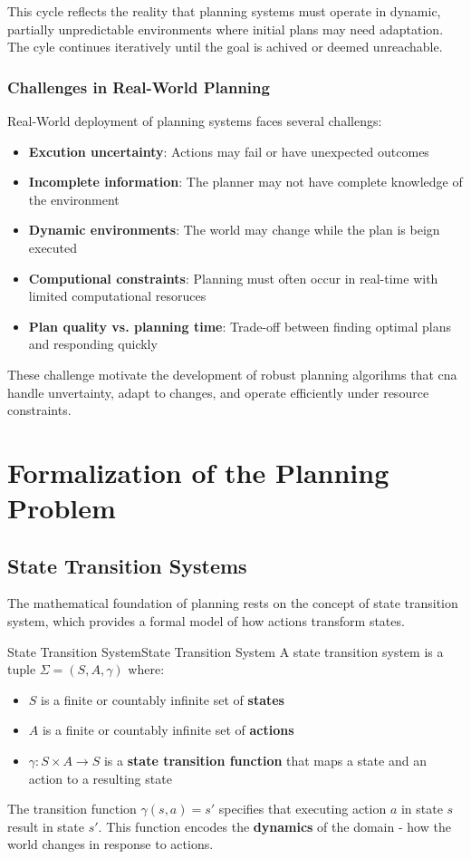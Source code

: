 \documentclass[a4paper]{article}
\theoremstyle{definition}
\begin{document}
This cycle reflects the reality that planning systems must operate in dynamic, partially unpredictable environments where
initial plans may need adaptation. The cyle continues iteratively until the goal is achived or deemed unreachable.
\subsubsection{Challenges in Real-World Planning}
Real-World deployment of planning systems faces several challengs:
\begin{itemize}
    \item \textbf{Excution uncertainty}: Actions may fail or have unexpected outcomes
    \item \textbf{Incomplete information}: The planner may not have complete knowledge of the environment
    \item \textbf{Dynamic environments}: The world may change while the plan is beign executed
    \item \textbf{Computional constraints}: Planning must often occur in real-time with limited computational resoruces 
    \item \textbf{Plan quality vs. planning time}: Trade-off between finding optimal plans and responding quickly
\end{itemize}
These challenge motivate the development of robust planning algorihms that cna handle unvertainty, adapt to changes,
and operate efficiently under resource constraints.
\section{Formalization of the Planning Problem}
\subsection{State Transition Systems}
The mathematical foundation of planning rests on the concept of state transition system, which provides a formal model of 
how actions transform states.

\begin{definition}{State Transition System}{State Transition System}
A state transition system is a tuple \( \Sigma = (S,A,\gamma) \) where:
\begin{itemize}
    \item \( S \) is a finite or countably infinite set of \textbf{states}
    \item \( A \) is a finite or countably infinite set of \textbf{actions}
    \item \( \gamma : S \times A \rightarrow S \) is a \textbf{state transition function} that maps a state and an action to a resulting state
\end{itemize}
\end{definition}
The transition function \( \gamma(s,a) = s' \) specifies that executing action \( a \) in state \( s \) result in state
\( s' \). This function encodes the \textbf{dynamics} of the domain - how the world changes in response to actions.
\end{document}
